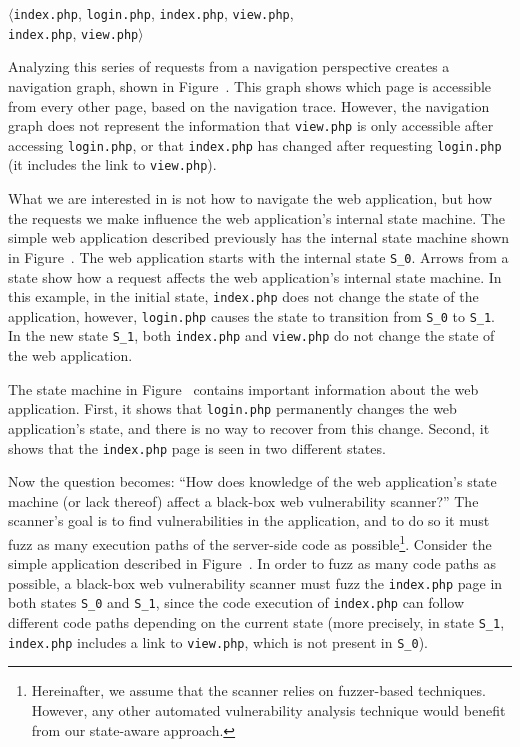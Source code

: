 \noindent{}$\langle$\texttt{index.php}, \texttt{login.php}, \texttt{index.php},
\texttt{view.php}, \\
\phantom{$\langle$}\texttt{index.php}, \texttt{view.php}$\rangle$

Analyzing this series of requests from a navigation perspective creates a
navigation graph, shown in Figure~. This graph shows
which page is accessible from every other page, based on the navigation trace.
However, the navigation graph does not represent the information that
\texttt{view.php} is only accessible after accessing \texttt{login.php}, or
that \texttt{index.php} has changed after requesting \texttt{login.php} (it
includes the link to \texttt{view.php}).

What we are interested in is not how to navigate the web application, but how
the requests we make influence the web application's internal state machine.
The simple web application described previously has the internal state machine shown
in Figure~. The web application starts with the internal
state \texttt{S\_0}. Arrows from a state show how a request affects the web
application's internal state machine. In this example, in the initial state,
\texttt{index.php} does not change the state of the application, however,
\texttt{login.php} causes the state to transition from \texttt{S\_0} to
\texttt{S\_1}. In the new state \texttt{S\_1}, both \texttt{index.php} and
\texttt{view.php} do not change the state of the web application.

The state machine in Figure~ contains important
information about the web application. First, it shows that \texttt{login.php}
permanently changes the web application's state, and there is no way to recover
from this change. Second, it shows that the \texttt{index.php} page is seen in
two different states.

Now the question becomes: ``How does knowledge of the web application's state
machine (or lack thereof) affect a black-box web vulnerability scanner?'' The
scanner's goal is to find vulnerabilities in the application, and to do so it
must fuzz as many execution paths of the server-side code as
possible\footnote{Hereinafter, we assume that the scanner relies on
  fuzzer-based techniques. However, any other automated vulnerability analysis
  technique would benefit from our state-aware approach.}. Consider the simple
application described in Figure~. In order to fuzz as
many code paths as possible, a black-box web vulnerability scanner must fuzz
the \texttt{index.php} page in both states \texttt{S\_0} and \texttt{S\_1},
since the code execution of \texttt{index.php} can follow different code paths
depending on the current state (more precisely, in state \texttt{S\_1},
\texttt{index.php} includes a link to \texttt{view.php}, which is not present
in \texttt{S\_0}).

